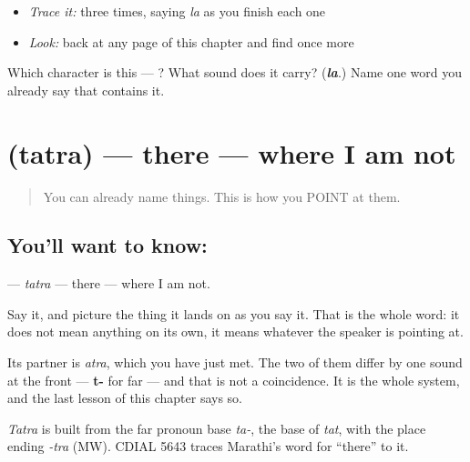 \begin{quote}
\end{quote}

\begin{itemize}
\raggedright
  \item \emph{Trace it:}  three times, saying \emph{la} as you finish each one
  \item \emph{Look:} back at any page of this chapter and find  once more
\end{itemize}

\begin{tcolorbox}[breakable,colback=teal!4,colframe=teal!35!black,title={Before you move on}]
Which character is this — ? What sound does it carry? (\emph{\textbf{la}}.) Name one word you already say that contains it.
\end{tcolorbox}
\section[\texorpdfstring{\sk{तत्र} (tatra)}{तत्र (tatra)}]{ (tatra) — there — where I am not}

\label{lesson:SA-C14-there}



\begin{quote}
You can already name things. This is how you POINT at them.
\end{quote}

\subsection*{You'll want to know: }
\textbf{} — \emph{tatra} — there — where I am not.

Say it, and picture the thing it lands on as you say it. That is the whole word: it does not mean anything on its own, it means whatever the speaker is pointing at.

Its partner is \textbf{} \emph{atra}, which you have just met. The two of them differ by one sound at the front — \textbf{t-} for far — and that is not a coincidence. It is the whole system, and the last lesson of this chapter says so.

\begin{cousinweb}
\emph{Tatra} is built from the far pronoun base \emph{ta-}, the base of \emph{tat}, with the place ending \emph{-tra} (MW). CDIAL 5643 traces Marathi's word for \textquotedblleft{}there\textquotedblright{} to it.
\end{cousinweb}

